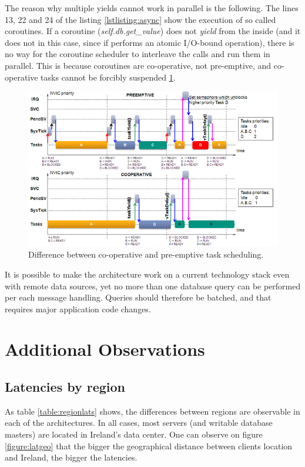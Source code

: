 \documentclass{uvamscse}
\begin{document}
The reason why multiple yields cannot work in parallel is the following. The lines 13, 22 and 24 of the listing \ref{lstlisting:async} show the execution of so called coroutines. If a coroutine (\textit{self.db.get\_value}) does not \textit{yield} from the inside (and it does not in this case, since if performs an atomic I/O-bound operation), there is no way for the coroutine scheduler to interleave the calls and run them in parallel. This is because coroutines are co-operative, not pre-emptive, and co-operative tasks cannot be forcibly suspended \ref{figure:cooppreemp}.

\begin{figure}[H]
\centering
\includegraphics[scale=0.7]{cooppreemp}
\caption{Difference between co-operative and pre-emptive task scheduling.}
\label{figure:cooppreemp}
\end{figure}

It is possible to make the architecture work on a current technology stack even with remote data sources, yet no more than one database query can be performed per each message handling. Queries should therefore be batched, and that requires major application code changes.

\section{Additional Observations}

\subsection{Latencies by region}
As table \ref{table:regionlats} shows, the differences between regions are observable in each of the architectures. In all cases, most servers (and writable database masters) are located in Ireland's data center. One can observe on figure \ref{figure:latgeo} that the bigger the geographical distance between clients location and Ireland, the bigger the latencies.
\end{document}
